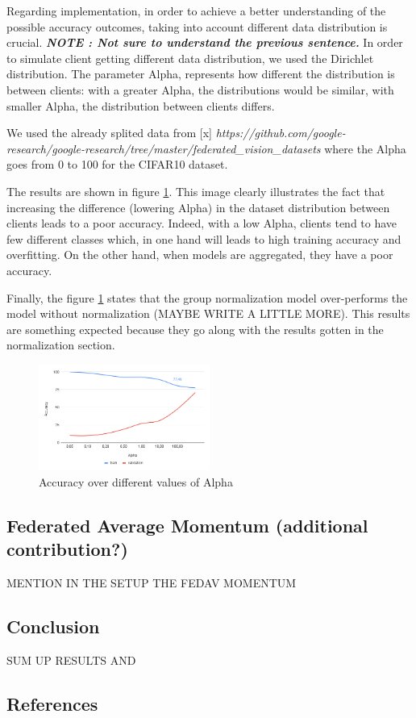 \documentclass[twocolumn]{article}
\begin{document}
Regarding implementation, in order to achieve a better understanding of the possible accuracy outcomes, taking into account different data distribution is crucial. \textbf{\emph{NOTE : Not sure to understand the previous sentence.}} In order to simulate client getting different data distribution, we used the Dirichlet distribution. The parameter Alpha, represents how different the distribution is between clients: with a greater Alpha, the distributions 
would be similar, with smaller Alpha, the distribution between clients differs.

We used the already splited data from [x] \emph{https://github.com/google-research/google-research/tree/master/federated_vision_datasets} where the Alpha goes from 0 to 100 for the CIFAR10 dataset.

The results are shown in figure \ref{AccAlpha}. This image clearly illustrates the fact that increasing the difference (lowering Alpha) in the dataset distribution between clients leads to a poor accuracy. Indeed, with a low Alpha, clients tend to have few different classes which, in one hand will leads to high training accuracy and overfitting. On the other hand, when models are aggregated, they have a poor accuracy.

Finally, the figure \ref{AccAlpha} states that the group normalization model over-performs the model without normalization (MAYBE WRITE A LITTLE MORE). This results are something expected because they go along with the results gotten in the normalization section. 



\begin{figure}
    \centering
    \includegraphics[width=0.5\textwidth,height=.3\textheight]{alphaAccuracy.png}
    \caption{Accuracy over different values of Alpha}
    \label{AccAlpha} 
\end{figure}


\subsection{Federated Average Momentum (additional contribution?)}
MENTION IN THE SETUP THE FEDAV MOMENTUM

\subsection{Conclusion}
SUM UP RESULTS AND 
\subsection{References}
\end{document}
